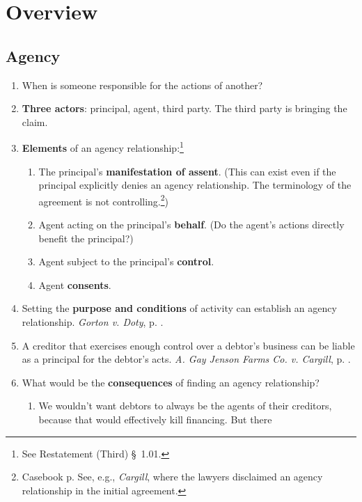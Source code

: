 \section{Overview}

\subsection{Agency}

\begin{enumerate}
    \item When is someone responsible for the actions of another?
    \item \textbf{Three actors}: principal, agent, third party. The third 
    party is bringing the claim.
    \item \textbf{Elements} of an agency relationship:\footnote{See 
    Restatement (Third) \S\ 1.01.}
    \begin{enumerate}
        \item The principal's \textbf{manifestation of assent}. (This can 
        exist even if the principal explicitly denies an agency relationship. 
        The terminology of the agreement is not controlling.\footnote{Casebook 
        p. See, e.g., \emph{Cargill}, where the lawyers disclaimed an agency 
        relationship in the initial agreement.})
        \item Agent acting on the principal's \textbf{behalf}. (Do the agent's 
        actions directly benefit the principal?)
        \item Agent subject to the principal's \textbf{control}.
        \item Agent \textbf{consents}.
    \end{enumerate}
    \item Setting the \textbf{purpose and conditions} of activity can 
    establish an agency relationship. \emph{Gorton v. Doty}, p. 
    \pageref{subsub:gorton}.
    \item A creditor that exercises enough control over a debtor's business 
    can be liable as a principal for the debtor's acts. \emph{A. Gay Jenson 
    Farms Co. v. Cargill}, p. \pageref{subsub:cargill}.
    \item What would be the \textbf{consequences} of finding an agency 
    relationship?
    \begin{enumerate}
        \item We wouldn't want debtors to always be the agents of their 
        creditors, because that would effectively kill financing. But there 

\end{enumerate}
\end{enumerate}
